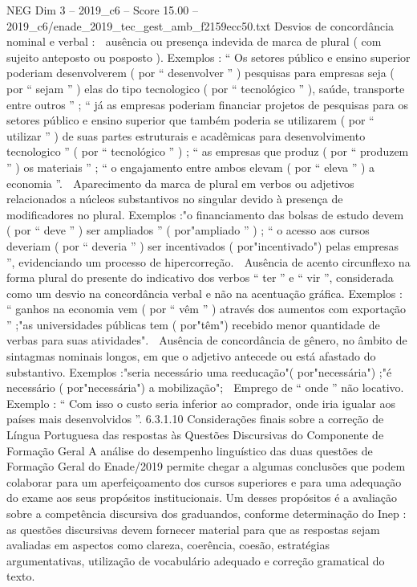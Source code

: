 \begin{textsample}{NEG Dim 3 – 2019\_c6 – Score 15.00 – 2019\_c6/enade\_2019\_tec\_gest\_amb\_f2159ecc50.txt}
Desvios de concordância nominal e verbal :  ausência ou presença indevida de marca de plural ( com sujeito anteposto ou posposto ).
Exemplos : “ Os setores público e ensino superior poderiam desenvolverem ( por “ desenvolver ” ) pesquisas para empresas seja ( por “ sejam ” ) elas do tipo tecnologico ( por “ tecnológico ” ), saúde, transporte entre outros ” ; “ já as empresas poderiam financiar projetos de pesquisas para os setores público e ensino superior que também poderia se utilizarem ( por “ utilizar ” ) de suas partes estruturais e acadêmicas para desenvolvimento tecnologico ” ( por “ tecnológico ” ) ; “ as empresas que produz ( por “ produzem ” ) os materiais ” ; “ o engajamento entre ambos elevam ( por “ eleva ” ) a economia ”.  Aparecimento da marca de plural em verbos ou adjetivos relacionados a núcleos substantivos no singular devido à presença de modificadores no plural.
Exemplos :"o financiamento das bolsas de estudo devem ( por “ deve ” ) ser ampliados ” ( por"ampliado ” ) ; “ o acesso aos cursos deveriam ( por “ deveria ” ) ser incentivados ( por"incentivado") pelas empresas ”, evidenciando um processo de hipercorreção.  Ausência de acento circunflexo na forma plural do presente do indicativo dos verbos “ ter ” e “ vir ”, considerada como um desvio na concordância verbal e não na acentuação gráfica.
Exemplos : “ ganhos na economia vem ( por “ vêm ” ) através dos aumentos com exportação ” ;"as universidades públicas tem ( por"têm") recebido menor quantidade de verbas para suas atividades".  Ausência de concordância de gênero, no âmbito de sintagmas nominais longos, em que o adjetivo antecede ou está afastado do substantivo.
Exemplos :"seria necessário uma reeducação"( por"necessária") ;"é necessário ( por"necessária") a mobilização";  Emprego de “ onde ” não locativo.
Exemplo : “ Com isso o custo seria inferior ao comprador, onde iria igualar aos países mais desenvolvidos ”. 6.3.1.10 Considerações finais sobre a correção de Língua Portuguesa das respostas às Questões Discursivas do Componente de Formação Geral A análise do desempenho linguístico das duas questões de Formação Geral do Enade/2019 permite chegar a algumas conclusões que podem colaborar para um aperfeiçoamento dos cursos superiores e para uma adequação do exame aos seus propósitos institucionais.
Um desses propósitos é a avaliação sobre a competência discursiva dos graduandos, conforme determinação do Inep : as questões discursivas devem fornecer material para que as respostas sejam avaliadas em aspectos como clareza, coerência, coesão, estratégias argumentativas, utilização de vocabulário adequado e correção gramatical do texto.

\end{textsample}

